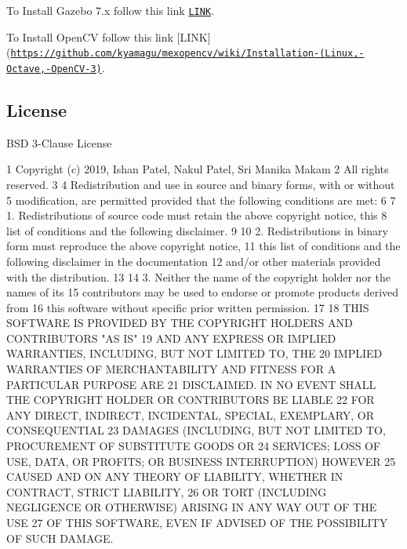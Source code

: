 \begin{DoxyItemize}
\item To Install Gazebo 7.\+x follow this link \href{http://gazebosim.org/tutorials?tut=install_ubuntu&ver=7.0}{\tt L\+I\+NK}.
\item To Install Open\+CV follow this link \mbox{[}L\+I\+NK\mbox{]}(\href{https://github.com/kyamagu/mexopencv/wiki/Installation-(Linux,-Octave,-OpenCV-3)}{\tt https\+://github.\+com/kyamagu/mexopencv/wiki/\+Installation-\/(\+Linux,-\/\+Octave,-\/\+Open\+C\+V-\/3)}.
\end{DoxyItemize}

\subsection*{License}

B\+SD 3-\/\+Clause License 
\begin{DoxyCode}
1 Copyright (c) 2019, Ishan Patel, Nakul Patel, Sri Manika Makam
2 All rights reserved.
3 
4 Redistribution and use in source and binary forms, with or without
5 modification, are permitted provided that the following conditions are met:
6 
7 1. Redistributions of source code must retain the above copyright notice, this
8    list of conditions and the following disclaimer.
9 
10 2. Redistributions in binary form must reproduce the above copyright notice,
11    this list of conditions and the following disclaimer in the documentation
12    and/or other materials provided with the distribution.
13 
14 3. Neither the name of the copyright holder nor the names of its
15    contributors may be used to endorse or promote products derived from
16    this software without specific prior written permission.
17 
18 THIS SOFTWARE IS PROVIDED BY THE COPYRIGHT HOLDERS AND CONTRIBUTORS "AS IS"
19 AND ANY EXPRESS OR IMPLIED WARRANTIES, INCLUDING, BUT NOT LIMITED TO, THE
20 IMPLIED WARRANTIES OF MERCHANTABILITY AND FITNESS FOR A PARTICULAR PURPOSE ARE
21 DISCLAIMED. IN NO EVENT SHALL THE COPYRIGHT HOLDER OR CONTRIBUTORS BE LIABLE
22 FOR ANY DIRECT, INDIRECT, INCIDENTAL, SPECIAL, EXEMPLARY, OR CONSEQUENTIAL
23 DAMAGES (INCLUDING, BUT NOT LIMITED TO, PROCUREMENT OF SUBSTITUTE GOODS OR
24 SERVICES; LOSS OF USE, DATA, OR PROFITS; OR BUSINESS INTERRUPTION) HOWEVER
25 CAUSED AND ON ANY THEORY OF LIABILITY, WHETHER IN CONTRACT, STRICT LIABILITY,
26 OR TORT (INCLUDING NEGLIGENCE OR OTHERWISE) ARISING IN ANY WAY OUT OF THE USE
27 OF THIS SOFTWARE, EVEN IF ADVISED OF THE POSSIBILITY OF SUCH DAMAGE.
\end{DoxyCode}


